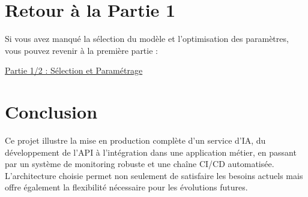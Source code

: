 \documentclass[
  letterpaper,
  DIV=11,
  numbers=noendperiod]{scrartcl}
\begin{document}
\section{Retour à la Partie 1}\label{retour-uxe0-la-partie-1}

Si vous avez manqué la sélection du modèle et l'optimisation des
paramètres, vous pouvez revenir à la première partie :

\href{index.qmd}{Partie 1/2 : Sélection et Paramétrage}

\section{Conclusion}\label{conclusion}

Ce projet illustre la mise en production complète d'un service d'IA, du
développement de l'API à l'intégration dans une application métier, en
passant par un système de monitoring robuste et une chaîne CI/CD
automatisée. L'architecture choisie permet non seulement de satisfaire
les besoins actuels mais offre également la flexibilité nécessaire pour
les évolutions futures.
\end{document}

